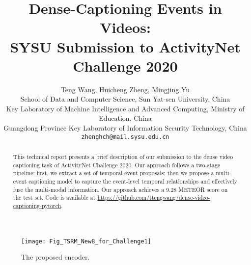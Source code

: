 \documentclass[10pt,twocolumn,letterpaper]{article}
\begin{document}
\title{Dense-Captioning Events in Videos: \\SYSU Submission to ActivityNet Challenge 2020}

\iftrue
\author{Teng Wang, Huicheng Zheng, Mingjing Yu\\
School of Data and Computer Science, Sun Yat-sen University, China\\
Key Laboratory of Machine Intelligence and Advanced Computing, Ministry of Education, China\\
Guangdong Province Key Laboratory of Information Security Technology, China\\
{\tt\small {zhenghch@mail}.sysu.edu.cn}\\
}
\fi
\maketitle


\begin{figure*}
	\centering
	\texttt{[image: Fig\_TSRM\_New8\_for\_Challenge1]}
	\caption{The proposed encoder.}
	\label{fig:encoder}
\end{figure*}

\begin{abstract}
   This technical report presents a brief description of our submission to the dense video captioning task of ActivityNet Challenge 2020. Our approach follows a two-stage pipeline: first, we extract a set of temporal event proposals; then we propose a multi-event captioning model to capture the event-level temporal relationships and effectively fuse the multi-modal information. Our approach achieves a 9.28 METEOR score on the test set. Code is available at \url{https://github.com/ttengwang/dense-video-captioning-pytorch}.
\end{abstract}
\end{document}
